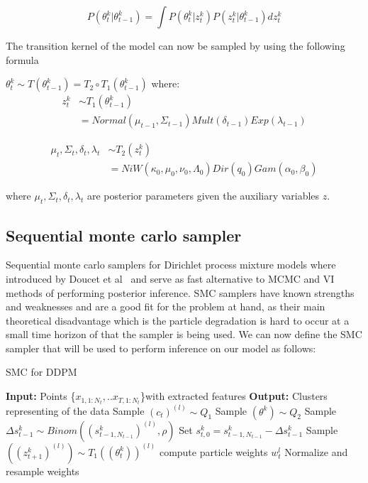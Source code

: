 \documentclass[twoside,hidelinks]{article}
\begin{document}
$$ P(\theta_t^k | \theta_{t-1}^k) =  \int P(\theta_t^k | z_{t}^k)   P(z_t^k| \theta_{t-1}^k) dz_t^k $$

The transition kernel of the model can now be sampled by using the following formula

$\theta_t^k \sim T(\theta_{t-1}^k) = T_2 \circ T_1(\theta_{t-1}^k)$ where:
\begin{equation} \label{eq1}
\begin{split}
z_t^k  & \sim T_1(\theta_{t-1}^k)\\
 & = Normal(\mu_{t-1}, \Sigma_{t-1}) Mult( \delta_{t-1}) Exp( \lambda_{t-1})
\end{split}
\end{equation}

\begin{equation}
\begin{split}
\mu_t, \Sigma_t, \delta_t,  \lambda_t & \sim T_2(z_t^k)\\
 & = NiW( \kappa_0, \mu_0, \nu_0, \Lambda_0 ) Dir(q_0) Gam(\alpha_0, \beta_0) 
\end{split}
\end{equation}

where $\mu_t, \Sigma_t, \delta_t,  \lambda_t$  are posterior parameters given the auxiliary variables $z$.

\subsection{Sequential monte carlo sampler}

Sequential monte carlo samplers for Dirichlet process mixture models where introduced by Doucet et al~\cite{doucet} and serve as fast alternative to MCMC and VI methods of performing posterior inference. SMC samplers have known strengths and weaknesses and are a good fit for the problem at hand, as their main theoretical disadvantage which is the particle degradation is hard to occur at a small time horizon of that the sampler is being used. We can now define the SMC sampler that will be used to perform inference on our model as follows:

\begin{algorithm}[h]
  \caption{SMC for DDPM}\label{SMC}
  \begin{algorithmic}[1]
	\State \textbf{Input:} Points \{$x_{1,1:N_t}, ..x_{T,1:N_t}$\}with extracted features
	\State \textbf{Output:} Clusters representing of the data
								\State Sample $(c_t)^{(l)} \sim Q_1$  
								\State Sample $(\theta^k ) \sim Q_2$
						    \EndFor		
		    \EndFor
			   \State Sample $\Delta s_{t-1}^k \sim Binom( (s_{t-1,N_{t-1}}^k)^{(l)}, \rho) $ 
		       \State Set $s_{t,0}^{k} = s_{t-1,N_{t-1}}^{k} -\Delta s_{t-1}^k$
   		       \State Sample $( (z_{t+1}^k)^{(l)} ) \sim T_1((\theta_t^k))^{(l)} $
		    \EndFor
		 	\State compute particle weights $w_t^l$
    \EndFor
    \State Normalize and resample weights
  \end{algorithmic}
\end{algorithm}
\end{document}
